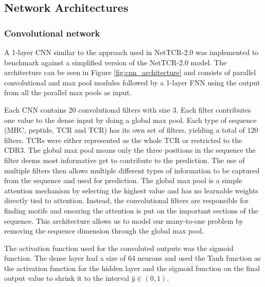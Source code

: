\subsection{Network Architectures}

\subsubsection{Convolutional network}
A 1-layer CNN similar to the approach used in NetTCR-2.0 \cite{Montemurro2021NetTCR-2.0Data} was implemented to benchmark against a simplified version of the NetTCR-2.0 model. The architecture can be seen in Figure \ref{fig:cnn_architecture} and consists of parallel convolutional and max pool modules followed by a 1-layer FNN using the output from all the parallel max pools as input.

Each CNN contains 20 convolutional filters with size 3. Each filter contributes one value to the dense input by doing a global max pool. Each type of sequence (MHC, peptide, TCR{\textalpha} and TCR{\textbeta}) has its own set of filters, yielding a total of 120 filters. TCRs were either represented as the whole TCR or restricted to the CDR3. The global max pool means only the three positions in the sequence the filter deems most informative get to contribute to the prediction. The use of multiple filters then allows multiple different types of information to be captured from the sequence and used for prediction. The global max pool is a simple attention mechanism by selecting the highest value and has no learnable weights directly tied to attention. Instead, the convolutional filters are responsible for finding motifs and ensuring the attention is put on the important sections of the sequence. This architecture allows us to model our many-to-one problem by removing the sequence dimension through the global max pool.

The activation function used for the convoluted outputs was the sigmoid function. The dense layer had a size of 64 neurons and used the Tanh function as the activation function for the hidden layer and the sigmoid function on the final output value to shrink it to the interval $\hat{y} \in (0,1)$.

